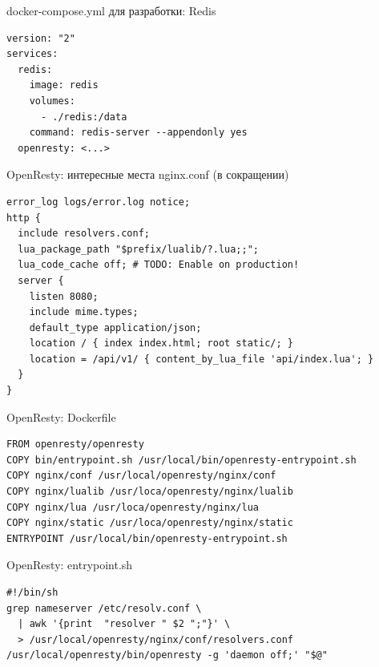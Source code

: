 \documentclass[aspectratio=169,handout,bigger]{beamer}
\begin{document}
\begin{frame}[fragile]{docker-compose.yml для разработки: Redis}
\begin{verbatim}
version: "2"
services:
  redis:
    image: redis
    volumes:
      - ./redis:/data
    command: redis-server --appendonly yes
  openresty: <...>
\end{verbatim}
\end{frame}


\begin{frame}[fragile]{OpenResty: интересные места nginx.conf (в сокращении)}
\begin{verbatim}
error_log logs/error.log notice;
http {
  include resolvers.conf;
  lua_package_path "$prefix/lualib/?.lua;;";
  lua_code_cache off; # TODO: Enable on production!
  server {
    listen 8080;
    include mime.types;
    default_type application/json;
    location / { index index.html; root static/; }
    location = /api/v1/ { content_by_lua_file 'api/index.lua'; }
  }
}
\end{verbatim}
\end{frame}


\begin{frame}[fragile]{OpenResty: Dockerfile}
\begin{verbatim}
FROM openresty/openresty
COPY bin/entrypoint.sh /usr/local/bin/openresty-entrypoint.sh
COPY nginx/conf /usr/local/openresty/nginx/conf
COPY nginx/lualib /usr/loca/openresty/nginx/lualib
COPY nginx/lua /usr/loca/openresty/nginx/lua
COPY nginx/static /usr/loca/openresty/nginx/static
ENTRYPOINT /usr/local/bin/openresty-entrypoint.sh
\end{verbatim}
\end{frame}


\begin{frame}[fragile]{OpenResty: entrypoint.sh}
\begin{verbatim}
#!/bin/sh
grep nameserver /etc/resolv.conf \
  | awk '{print  "resolver " $2 ";"}' \
  > /usr/local/openresty/nginx/conf/resolvers.conf
/usr/local/openresty/bin/openresty -g 'daemon off;' "$@"
\end{verbatim}
\end{frame}
\end{document}
